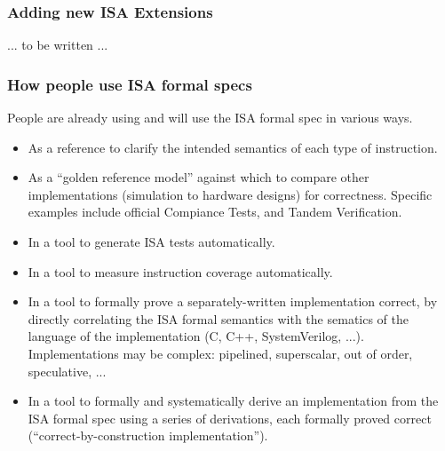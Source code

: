 \documentclass[aspectratio=169]{beamer}
\newcommand{\slidefont}{\scriptsize}
\begin{document}

\begin{frame}
  \frametitle{Adding new ISA Extensions}

  ... to be written ...
\end{frame}


\begin{frame}
  \frametitle{How people use ISA formal specs}

  \slidefont

  People are already using and will use the ISA formal spec in various ways.

  \begin{itemize}
    \item As a reference to clarify the intended semantics of each type of instruction.

    \item As a ``golden reference model'' against which to compare
      other implementations (simulation to hardware designs) for
      correctness.  Specific examples include official Compiance
      Tests, and Tandem Verification.

    \item In a tool to generate ISA tests automatically.

    \item In a tool to measure instruction coverage automatically.

    \item In a tool to formally prove a separately-written
      implementation correct, by directly correlating the ISA formal
      semantics with the sematics of the language of the
      implementation (C, C++, SystemVerilog, ...).  Implementations
      may be complex: pipelined, superscalar, out of order,
      speculative, ...

    \item In a tool to formally and systematically derive an
      implementation from the ISA formal spec using a series of
      derivations, each formally proved correct
      (``correct-by-construction implementation'').

  \end{itemize}

\end{frame}

\end{document}
